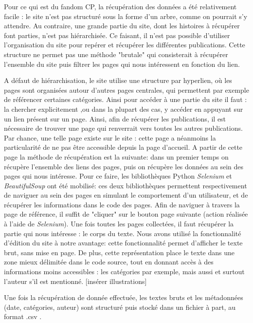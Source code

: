 \documentclass[12pt,a4paper,oneside,titlepage]{book} %
\begin{document}
	Pour ce qui est du fandom CP, la récupération des données a été relativement facile : le site n'est pas structuré sous la forme d'un arbre, comme on pourrait s'y attendre. Au contraire, une grande partie du site, dont les histoires à récupérer font parties, n'est pas hiérarchisée. Ce faisant, il n'est pas possible d'utiliser l'organisation du site pour repérer et récupérer les différentes publications.
	Cette structure ne permet pas une méthode "brutale" qui consisterait à récupérer l'ensemble du site puis filtrer les pages qui nous intéressent en fonction du lien.
	
	A défaut de hiérarchisation, le site utilise une structure par hyperlien, où les pages sont organisées autour d'autres pages centrales, qui permettent par exemple de référencer certaines catégories. Ainsi pour accéder à une partie du site il faut : la chercher explicitement ,ou dans la plupart des cas, y accéder en appuyant sur un lien présent sur un page. 
	Ainsi, afin de récupérer les publications, il est nécessaire de trouver une page qui renverrait vers toutes les autres publications. Par chance, une telle page existe sur le site : cette page a néanmoins la particularité de ne pas être accessible depuis la page d'accueil.
	A partir de cette page la méthode de récupération est la suivante: dans un premier temps on récupère l'ensemble des liens des pages, puis on récupère les données au sein des pages qui nous intéresse. 
	Pour ce faire, les bibliothèques Python \emph{Selenium} et \emph{BeautifulSoup} ont été mobilisé: ces deux bibliothèques permettent respectivement de naviguer au sein des pages en simulant le comportement d'un utilisateur, et de récupérer les informations dans le code des pages. 
	Afin de naviguer à travers la page de référence, il suffit de "cliquer" sur le bouton page suivante (action réalisée à l'aide de \emph{Selenium}). Une fois toutes les pages collectées, il faut récupérer la partie qui nous intéresse : le corps du texte. 
	Nous avons utilisé la fonctionnalité d'édition du site à notre avantage: cette fonctionnalité permet d'afficher le texte brut, sans mise en page. De plus, cette représentation place le texte dans une zone mieux délimitée dans le code source, tout en donnant accès à des informations moins accessibles : les catégories par exemple, mais aussi et surtout l'auteur s'il est mentionné. 
	[insérer illustrations]
	
	Une fois la récupération de donnée effectuée, les textes bruts et les métadonnées (date, catégories, auteur) sont structuré puis stocké dans un fichier à part, au format .csv .
	
\end{document}

